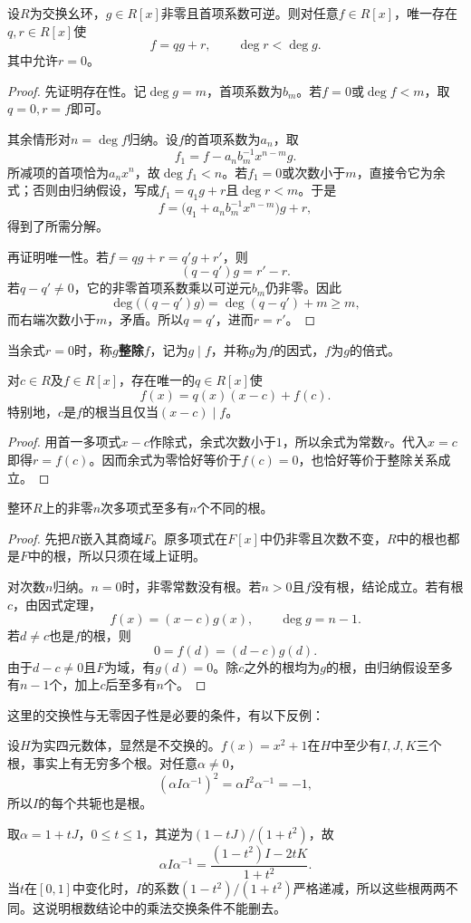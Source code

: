 \begin{theorem}\label{p2:poly-division}
设$R$为交换幺环，$g\in R[x]$非零且首项系数可逆。则对任意$f\in R[x]$，唯一存在$q,r\in R[x]$使
\[
f=qg+r,\qquad \deg r<\deg g.
\]
其中允许$r=0$。
\end{theorem}
\begin{proof}
先证明存在性。记$\deg g=m$，首项系数为$b_m$。若$f=0$或$\deg f<m$，取$q=0,r=f$即可。

其余情形对$n=\deg f$归纳。设$f$的首项系数为$a_n$，取
\[
f_1=f-a_nb_m^{-1}x^{n-m}g.
\]
所减项的首项恰为$a_nx^n$，故$\deg f_1<n$。若$f_1=0$或次数小于$m$，直接令它为余式；否则由归纳假设，写成$f_1=q_1g+r$且$\deg r<m$。于是
\[
f=\bigl(q_1+a_nb_m^{-1}x^{n-m}\bigr)g+r,
\]
得到了所需分解。

再证明唯一性。若$f=qg+r=q'g+r'$，则
\[
(q-q')g=r'-r.
\]
若$q-q'\ne0$，它的非零首项系数乘以可逆元$b_m$仍非零。因此
\[
\deg\bigl((q-q')g\bigr)=\deg(q-q')+m\ge m,
\]
而右端次数小于$m$，矛盾。所以$q=q'$，进而$r=r'$。
\end{proof}

\label{p2:concept:c3-divisibility}当余式$r=0$时，称$g$\textbf{整除}$f$，记为$g\mid f$，并称$g$为$f$的因式，$f$为$g$的倍式。

\begin{corollary}
对$c\in R$及$f\in R[x]$，存在唯一的$q\in R[x]$使
\[
f(x)=q(x)(x-c)+f(c).
\]
特别地，$c$是$f$的根当且仅当$(x-c)\mid f$。
\end{corollary}
\begin{proof}
用首一多项式$x-c$作除式，余式次数小于$1$，所以余式为常数$r$。代入$x=c$即得$r=f(c)$。因而余式为零恰好等价于$f(c)=0$，也恰好等价于整除关系成立。
\end{proof}

\begin{theorem}\label{p2:poly-roots}
整环$R$上的非零$n$次多项式至多有$n$个不同的根。
\end{theorem}
\begin{proof}
先把$R$嵌入其商域$F$。原多项式在$F[x]$中仍非零且次数不变，$R$中的根也都是$F$中的根，所以只须在域上证明。

对次数$n$归纳。$n=0$时，非零常数没有根。若$n>0$且$f$没有根，结论成立。若有根$c$，由因式定理，
\[
f(x)=(x-c)g(x),\qquad\deg g=n-1.
\]
若$d\ne c$也是$f$的根，则
\[
0=f(d)=(d-c)g(d).
\]
由于$d-c\ne0$且$F$为域，有$g(d)=0$。除$c$之外的根均为$g$的根，由归纳假设至多有$n-1$个，加上$c$后至多有$n$个。
\end{proof}
这里的交换性与无零因子性是必要的条件，有以下反例：
\begin{example}
设$H$为实四元数体，显然是不交换的。$f(x)=x^2+1$在$H$中至少有$I,J,K$三个根，事实上有无穷多个根。对任意$\alpha\ne0$，
\[
(\alpha I\alpha^{-1})^2
=\alpha I^2\alpha^{-1}=-1,
\]
所以$I$的每个共轭也是根。

取$\alpha=1+tJ$，$0\le t\le1$，其逆为$(1-tJ)/(1+t^2)$，故
\[
\alpha I\alpha^{-1}
=\frac{(1-t^2)I-2tK}{1+t^2}.
\]
当$t$在$[0,1]$中变化时，$I$的系数$(1-t^2)/(1+t^2)$严格递减，所以这些根两两不同。这说明根数结论中的乘法交换条件不能删去。
\end{example}

